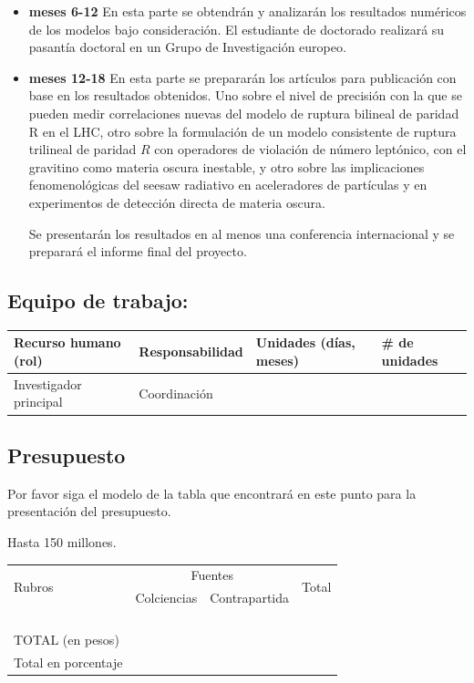 \begin{itemize}
\item \textbf{meses 6-12} En esta parte se obtendrán y analizarán los
  resultados numéricos de los modelos bajo consideración. El
  estudiante de doctorado realizará su pasantía doctoral en un Grupo
  de Investigación europeo. 

\item \textbf{meses 12-18} En esta parte se prepararán los artículos
  para publicación con base en los resultados obtenidos. Uno sobre el
  nivel de precisión con la que se pueden medir correlaciones nuevas
  del modelo de ruptura bilineal de paridad R en el LHC, otro sobre
  la formulación de un modelo consistente de ruptura trilineal de
  paridad $R$ con operadores de violación de número leptónico, con el
  gravitino como materia oscura inestable, y otro sobre las
  implicaciones fenomenológicas del seesaw radiativo en aceleradores
  de partículas y en experimentos de detección directa de materia
  oscura. 

  Se presentarán los resultados en al menos una conferencia
  internacional y se preparará el informe final del proyecto.
\end{itemize}

\subsection{Equipo de trabajo:}
\begin{tabular}{|l|l|l|l|}\hline
Recurso humano (rol)& Responsabilidad& Unidades (días, meses)& \# de unidades\\\hline
Investigador principal&Coordinación&&\\\hline
\end{tabular}

\subsection{Presupuesto}
\begin{instrucciones}
  Por favor siga el modelo de la tabla que encontrará en este punto
  para la presentación del presupuesto.

  Hasta 150 millones.
\end{instrucciones}
\begin{tabular}{|l|l|l|l|}\hline
  \multirow{2}{*}{Rubros}&\multicolumn{2}{c}{Fuentes}\vline&\multirow{2}{*}{Total}\\
  \cline{2-3} & Colciencias & Contrapartida & \\\hline 
 & & &\\\hline
 & & &\\\hline
 & & &\\\hline
 & & &\\\hline
TOTAL (en pesos) & & &\\\hline
Total en porcentaje & & &\\\hline
\end{tabular}

